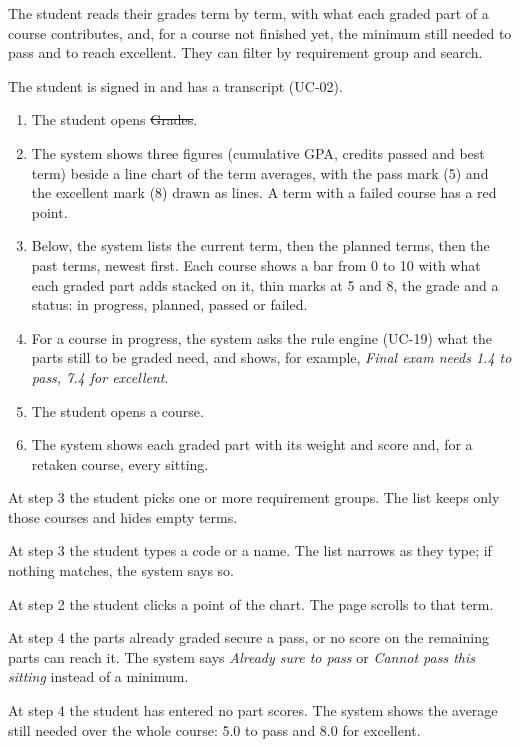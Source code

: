 The student reads their grades term by term, with what each graded part of a course contributes, and, for a course not
finished yet, the minimum still needed to pass and to reach excellent. They can filter by requirement group and search.

The student is signed in and has a transcript (UC-02).

\begin{enumerate}
  \item The student opens \st{Grades}.
  \item The system shows three figures (cumulative GPA, credits passed and best term) beside a line chart of the term
        averages, with the pass mark (5) and the excellent mark (8) drawn as lines. A term with a failed course has a red
        point.
  \item Below, the system lists the current term, then the planned terms, then the past terms, newest first. Each course
        shows a bar from 0 to 10 with what each graded part adds stacked on it, thin marks at 5 and 8, the grade and a
        status: in progress, planned, passed or failed.
  \item For a course in progress, the system asks the rule engine (UC-19) what the parts still to be graded need, and shows,
        for example, \emph{Final exam needs 1.4 to pass, 7.4 for excellent}.
  \item The student opens a course.
  \item The system shows each graded part with its weight and score and, for a retaken course, every sitting.
\end{enumerate}

\begin{altflows}
  \item[A1. Filter by group.] At step 3 the student picks one or more requirement groups. The list keeps only those courses
        and hides empty terms.
  \item[A2. Search.] At step 3 the student types a code or a name. The list narrows as they type; if nothing matches, the
        system says so.
  \item[A3. Jump to a term.] At step 2 the student clicks a point of the chart. The page scrolls to that term.
  \item[A4. Already passed, or out of reach.] At step 4 the parts already graded secure a pass, or no score on the
        remaining parts can reach it. The system says \emph{Already sure to pass} or \emph{Cannot pass this sitting}
        instead of a minimum.
  \item[A5. Part scores unknown.] At step 4 the student has entered no part scores. The system shows the average still
        needed over the whole course: 5.0 to pass and 8.0 for excellent.
\end{altflows}

